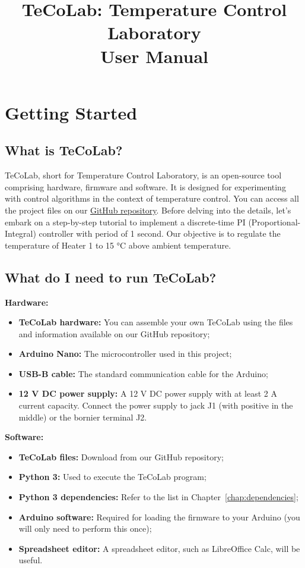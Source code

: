 \documentclass[12pt]{report}
\title{TeCoLab: Temperature Control Laboratory \\ User Manual}
\date{}
\begin{document}
\maketitle
\tableofcontents

\chapter{Getting Started}\label{chap:getstarted}

\section{What is TeCoLab?}\label{sec:WhatIsTecolab}

TeCoLab, short for Temperature Control Laboratory, is an open-source tool comprising hardware, firmware and software. It is designed for experimenting with control algorithms in the context of temperature control. You can access all the project files on our \href{https://github.com/ytcsc/TeCoLab/tree/main}{GitHub repository}. Before delving into the details, let's embark on a step-by-step tutorial to implement a discrete-time PI (Proportional-Integral) controller with period of 1 second. Our objective is to regulate the temperature of Heater 1 to 15 °C above ambient temperature.

\section{What do I need to run TeCoLab?}

\noindent \textbf{Hardware:}
\begin{itemize}
    \item \textbf{TeCoLab hardware:} You can assemble your own TeCoLab using the files and information available on our GitHub repository;
    \item \textbf{Arduino Nano:} The microcontroller used in this project;
    \item \textbf{USB-B cable:} The standard communication cable for the Arduino;
    \item \textbf{12 V DC power supply:} A 12 V DC power supply with at least 2 A current capacity. Connect the power supply to jack J1 (with positive in the middle) or the bornier terminal J2.
\end{itemize}

\noindent \textbf{Software:}
\begin{itemize}
    \item \textbf{TeCoLab files:} Download from our GitHub repository;
    \item \textbf{Python 3:} Used to execute the TeCoLab program;
    \item \textbf{Python 3 dependencies:} Refer to the list in Chapter~\ref{chap:dependencies};
    \item \textbf{Arduino software:} Required for loading the firmware to your Arduino (you will only need to perform this once);
    \item \textbf{Spreadsheet editor:} A spreadsheet editor, such as LibreOffice Calc, will be useful.
\end{itemize}
\end{document}
